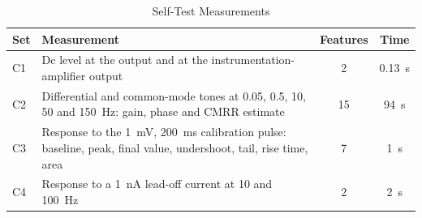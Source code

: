 \begin{table}[!t]
\caption{Self-Test Measurements}
\label{tab:measurements}
\centering
\setlength{\tabcolsep}{3pt}
\begin{tabular}{@{}lp{}cc@{}}
\toprule
Set & Measurement & Features & Time \\
\midrule
C1 & Dc level at the output and at the instrumentation-amplifier output & 2 & \SI{0.13}{\second} \\
C2 & Differential and common-mode tones at 0.05, 0.5, 10, 50 and \SI{150}{\hertz}: gain, phase and CMRR estimate & 15 & \SI{94}{\second} \\
C3 & Response to the \SI{1}{\milli\volt}, \SI{200}{\milli\second} calibration pulse: baseline, peak, final value, undershoot, tail, rise time, area & 7 & \SI{1}{\second} \\
C4 & Response to a \SI{1}{\nano\ampere} lead-off current at 10 and \SI{100}{\hertz} & 2 & \SI{2}{\second} \\
\bottomrule
\end{tabular}
\end{table}
